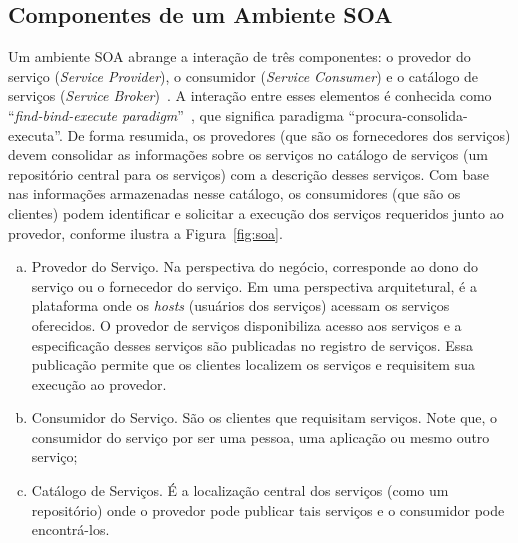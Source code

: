 \subsection{Componentes de um Ambiente SOA}\label{elem_soa}%

Um ambiente \acrshort{SOA} abrange a interação de três componentes: o provedor do serviço (\textit{Service Provider}), o consumidor (\textit{Service Consumer}) e o catálogo de serviços (\textit{Service Broker})~\cite{SOAIntBlueprint:2010,SOA_patterns_2012}. A interação entre esses elementos é conhecida como ``\textit{find-bind-execute paradigm}''~\cite{papazoglou2003service}, que significa paradigma ``procura-consolida-executa''. De forma resumida, 
os provedores (que são os fornecedores dos serviços) devem consolidar as informações sobre os serviços 
no catálogo de serviços (um repositório central para os serviços) com a descrição desses serviços. Com base nas informações armazenadas nesse catálogo, os consumidores (que são os clientes) podem identificar e solicitar a execução dos serviços requeridos junto ao provedor, conforme ilustra a Figura~\ref{fig:soa}.

\begin{enumerate}[(a)]

\item Provedor do Serviço. Na perspectiva do negócio, corresponde ao dono do serviço ou o fornecedor do serviço. Em uma perspectiva arquitetural, é a plataforma onde os \textit{hosts} (usuários dos serviços) acessam os serviços oferecidos. O provedor de serviços disponibiliza acesso aos serviços e a especificação desses serviços são publicadas no registro de serviços. Essa publicação permite que os clientes localizem os serviços e requisitem sua execução ao provedor.

\item Consumidor do Serviço. São os clientes que requisitam serviços. Note que, o consumidor do serviço por ser uma pessoa, uma aplicação ou mesmo outro serviço;

\item Catálogo de Serviços. É a localização central dos serviços (como  um repositório) onde o provedor pode publicar tais serviços e o consumidor pode encontrá-los. 

\end{enumerate}


